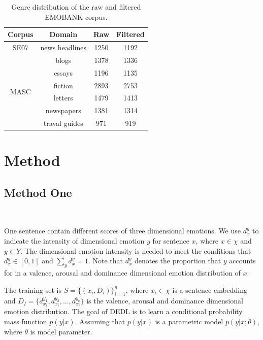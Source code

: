\begin{table}[htbp]  \centering
	\caption{Genre distribution of the raw and filtered
		EMOBANK corpus.}
	\label{tbl:emobank}
	\begin{tabular}{cccc}
		\toprule
		Corpus & Domain  & Raw & Filtered  \\
		\midrule
		SE07 &  news headlines &  1250 &  1192 \\
		\hline
		\multirow{6}{*}{MASC} &  blogs&  1378&  1336\\
		&  essays &  1196 &  1135 \\
		&  fiction &  2893 &  2753 \\
		&  letters &  1479 &  1413 \\
		& newspapers & 1381 & 1314 \\
		& traval guides & 971 & 919 \\
		\bottomrule
	\end{tabular}
\end{table}


\section{Method} \label{sec-method}

\subsection{Method One}
\

One sentence contain different scores of 
three dimensional emotions. 
We use $ d^y_{x} $ to indicate the intensity of 
dimensional emotion $ y $ for sentence $ x $, 
where $ x \in \chi  $ and $ y \in Y $.
The dimensional emotion intensity is needed to
meet the conditions that
$ d^y_{x} \in [0,1] $ and $\sum_{y}  d^y_{x} = 1$.
Note that $ d^y_{x} $ denotes the proportion that 
$ y $ accounts for in a valence, 
arousal  and dominance dimensional emotion distribution
of $ x $.

The training set is $ S = \{ ( x_{i} , D_{i} )  \}^{n}_{i=1} $,
where $ x_{i} \in \chi $ is a sentence embedding and
$ D_{I} = \{d^{y_{1}}_{x_{i}},  d^{y_{2}}_{x_{i}}, ... , d^{y_{c}}_{x_{i}}\} $
is the valence, arousal  and dominance dimensional emotion distribution.
The goal of DEDL is to 
learn a  conditional probability mass function $ p(y|x) $.
Assuming that $ p(y|x) $
is a parametric model $ p(y|x;{\theta}) $,
where $ \theta $ is model parameter.

